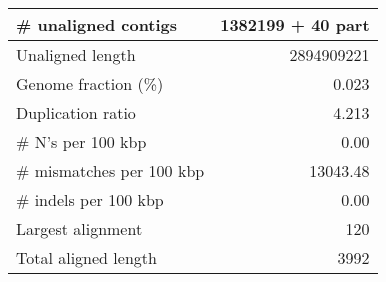 \documentclass[12pt,a4paper]{article}
\begin{document}
\begin{table}[ht]
\begin{center}
\begin{tabular}{|l*{1}{|r}|}
\# unaligned contigs & 1382199 + 40 part \\ \hline
Unaligned length & 2894909221 \\ \hline
Genome fraction (\%) & 0.023 \\ \hline
Duplication ratio & 4.213 \\ \hline
\# N's per 100 kbp & 0.00 \\ \hline
\# mismatches per 100 kbp & 13043.48 \\ \hline
\# indels per 100 kbp & 0.00 \\ \hline
Largest alignment & 120 \\ \hline
Total aligned length & 3992 \\ \hline
\end{tabular}
\end{center}
\end{table}
\end{document}
